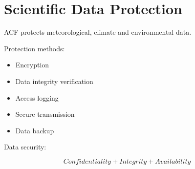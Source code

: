 \section{Scientific Data Protection}


ACF protects meteorological, climate and environmental data.



Protection methods:


\begin{itemize}

\item Encryption

\item Data integrity verification

\item Access logging

\item Secure transmission

\item Data backup

\end{itemize}



Data security:


\[
Confidentiality
+
Integrity
+
Availability
\]
